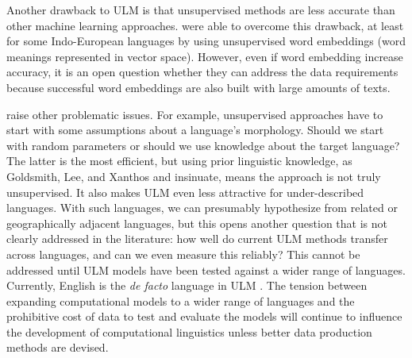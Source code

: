 \documentclass[12pt]{article}
\begin{document}
Another drawback to ULM is that unsupervised methods are less accurate than other machine learning approaches.  were able to overcome this drawback, at least for some Indo-European languages by using unsupervised word embeddings (word meanings represented in vector space). However, even if word embedding increase accuracy, it is an open question whether they can address the data requirements because successful word embeddings are also built with large amounts of texts. 

 raise other problematic issues. For example, unsupervised approaches have to start with some assumptions about a language's morphology. Should we start with random parameters or should we use knowledge about the target language? The latter is the most efficient, but using prior linguistic knowledge, as Goldsmith, Lee, and Xanthos and  insinuate, means the approach is not truly unsupervised. It also makes ULM even less attractive for under-described languages. With such languages, we can presumably hypothesize from related or geographically adjacent languages, but this opens another question that is not clearly addressed in the literature: how well do current ULM methods transfer across languages, and can we even measure this reliably? This cannot be addressed until ULM models have been tested against a wider range of languages. Currently, English is the \textit{de facto} language in ULM \cite{palmer_computational_2010}. The tension between expanding computational models to a wider range of languages and the prohibitive cost of data to test and evaluate the models will continue to influence the development of computational linguistics unless  better data production methods are devised.
\end{document}
